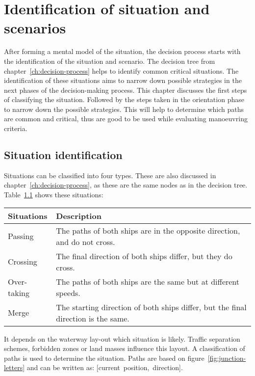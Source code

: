 \chapter{Identification of situation and scenarios}
\label{ch:identify-situation}
After forming a mental model of the situation, the decision process starts with the identification of the situation and scenario. The decision tree from chapter~\ref{ch:decision-process} helps to identify common critical situations. The identification of these situations aims to narrow down possible strategies in the next phases of the decision-making process. This chapter discusses the first steps of classifying the situation. Followed by the steps taken in the orientation phase to narrow down the possible strategies. This will help to determine which paths are common and critical, thus are good to be used while evaluating manoeuvring criteria.

\section{Situation identification}
\label{sec:situation-identification}
Situations can be classified into four types. These are also discussed in chapter~\ref{ch:decision-process}, as these are the same nodes as in the decision tree. Table~\ref{tab:situations2} shows these situations:
\begin{table}[H]
	\centering
	\begin{tabular}{p{}|p{}}
		\toprule
		Situations & Description\\
		\midrule
		Passing & The paths of both ships are in the opposite direction, and do not cross. \\
		Crossing & The final direction of both ships differ, but they do cross. \\
		Over-taking & The paths of both ships are the same but at different speeds. \\
		Merge & The starting direction of both ships differ, but the final direction is the same. \\
		\bottomrule
	\end{tabular}
	
	\label{tab:situations2}
\end{table}
It depends on the waterway lay-out which situation is likely. Traffic separation schemes, forbidden zones or land masses influence this layout. A classification of paths is used to determine the situation. Paths are based on figure~\ref{fig:junction-letters} and can be written as: [current~position,~direction].

